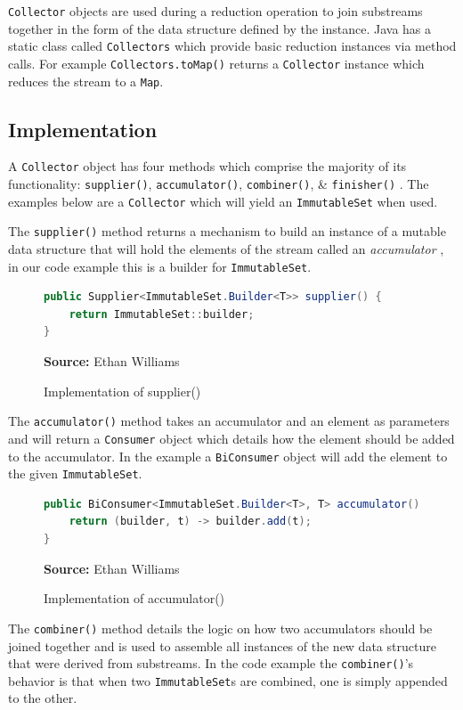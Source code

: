 \documentclass[oneside, 12pt]{article}
\newcommand{\source}[1]{\textbf{Source:} {#1} }
\begin{document}
\verb|Collector| objects are used during a reduction operation to join substreams together in the form of the data structure defined by the instance. Java has a static class called \verb|Collectors| which provide basic reduction instances via method calls. For example \verb|Collectors.toMap()| returns a \verb|Collector| instance which reduces the stream to a \verb|Map|. 

\subsection{Implementation}

A \verb|Collector| object has four methods which comprise the majority of its functionality: \verb|supplier()|, \verb|accumulator()|, \verb|combiner()|, \& \verb|finisher()| \autocite{collector_doc}. The examples below are a \verb|Collector| which will yield an \verb|ImmutableSet| when used.

The \verb|supplier()| method returns a mechanism to build an instance of a mutable data structure that will hold the elements of the stream called an \textit{accumulator} \autocite{custom_collector}, in our code example this is a builder for \verb|ImmutableSet|.

\begin{figure}[H]
\centering
\begin{lstlisting}[language=Java]
public Supplier<ImmutableSet.Builder<T>> supplier() {
    return ImmutableSet::builder;
}
\end{lstlisting}
\caption{Implementation of supplier()}
\source{Ethan Williams}
\label{fig:supplier}
\end{figure}

The \verb|accumulator()| method takes an accumulator and an element as parameters and will return a \verb|Consumer| object which details how the element should be added to the accumulator. In the example a \verb|BiConsumer| object will add the element to the given \verb|ImmutableSet|.

\begin{figure}[H]
\centering
\begin{lstlisting}[language=Java]
public BiConsumer<ImmutableSet.Builder<T>, T> accumulator() {
    return (builder, t) -> builder.add(t);
}
\end{lstlisting}
\caption{Implementation of accumulator()}
\source{Ethan Williams}
\label{fig:accumulator}
\end{figure}

The \verb|combiner()| method details the logic on how two accumulators should be joined together and is used to assemble all instances of the new data structure that were derived from substreams. In the code example the \verb|combiner()|'s behavior is that when two \verb|ImmutableSet|s are combined, one is simply appended to the other.
\end{document}
